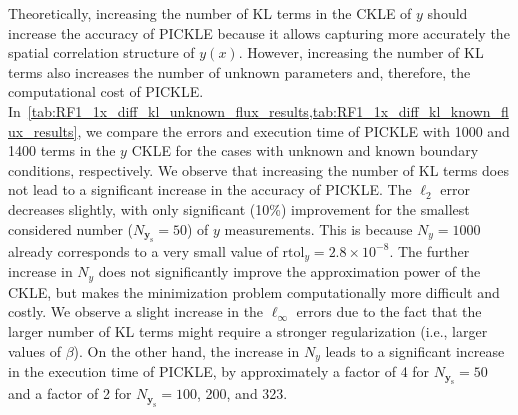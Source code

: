 \documentclass{agujournal2019}
\begin{document}
Theoretically, increasing the number of KL terms in the CKLE of $y$ should increase the accuracy of PICKLE because it allows capturing more accurately the spatial correlation structure of $y(x)$. However, increasing the number of KL terms also increases the number of unknown parameters and, therefore, the computational cost of PICKLE.
In~\cref{tab:RF1_1x_diff_kl_unknown_flux_results,tab:RF1_1x_diff_kl_known_flux_results},
we compare the errors and execution time of PICKLE with 1000 and 1400 terms in the $y$ CKLE for the cases with unknown and known boundary conditions, respectively.
We observe that increasing the number of KL terms does not lead to a significant increase in the accuracy of PICKLE.
The $\ell_2$ error decreases slightly, with only significant (10\%) improvement for the smallest considered number ($N_{\mathbf{y}_{\mathrm{s}}} = 50$) of $y$ measurements.
This is because $N_y = 1000$ already corresponds to a very small value of $\text{rtol}_y = 2.8 \times 10^{-8}$.
The further increase in $N_y$ does not significantly improve the approximation power of the CKLE, but makes the minimization problem computationally more difficult and costly. We observe a slight increase in the $\ell_\infty$ errors due to the fact that the larger number of KL terms might require a stronger regularization (i.e., larger values of $\beta$). On the other hand, the increase in $N_y$ leads to a significant increase in the execution time of PICKLE, by approximately a factor of 4 for $N_{\mathbf{y}_{\mathrm{s}}} = 50$ and a factor of 2 for $N_{\mathbf{y}_{\mathrm{s}}} = 100$, 200, and 323. 
\end{document}
